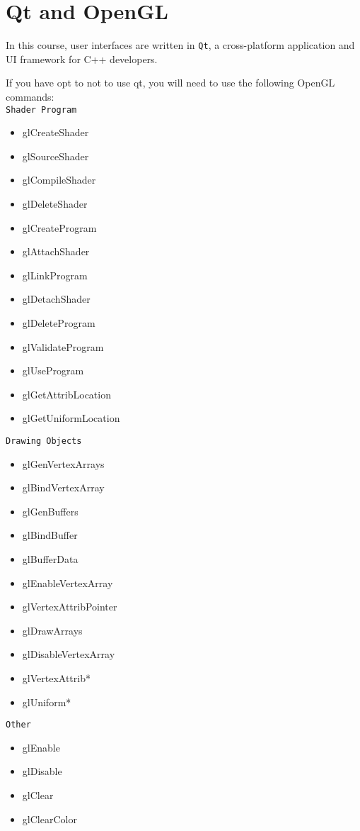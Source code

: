 \section{Qt and OpenGL}

In this course, user interfaces are written in \texttt{Qt}, a cross-platform
application and UI framework for C++ developers. 

If you have opt to not to use qt, you will need to use the following OpenGL
commands: \\

\texttt{Shader Program}
\begin{itemize}
    \item glCreateShader
    \item glSourceShader
    \item glCompileShader
    \item glDeleteShader
    \item glCreateProgram
    \item glAttachShader
    \item glLinkProgram
    \item glDetachShader
    \item glDeleteProgram
    \item glValidateProgram
    \item glUseProgram
    \item glGetAttribLocation
    \item glGetUniformLocation
\end{itemize} 

\texttt{Drawing Objects}
\begin{itemize}
    \item glGenVertexArrays
    \item glBindVertexArray
    \item glGenBuffers
    \item glBindBuffer
    \item glBufferData
    \item glEnableVertexArray
    \item glVertexAttribPointer
    \item glDrawArrays
    \item glDisableVertexArray
    \item glVertexAttrib*
    \item glUniform*
\end{itemize}

\texttt{Other}
\begin{itemize}
    \item glEnable
    \item glDisable
    \item glClear
    \item glClearColor
\end{itemize}

